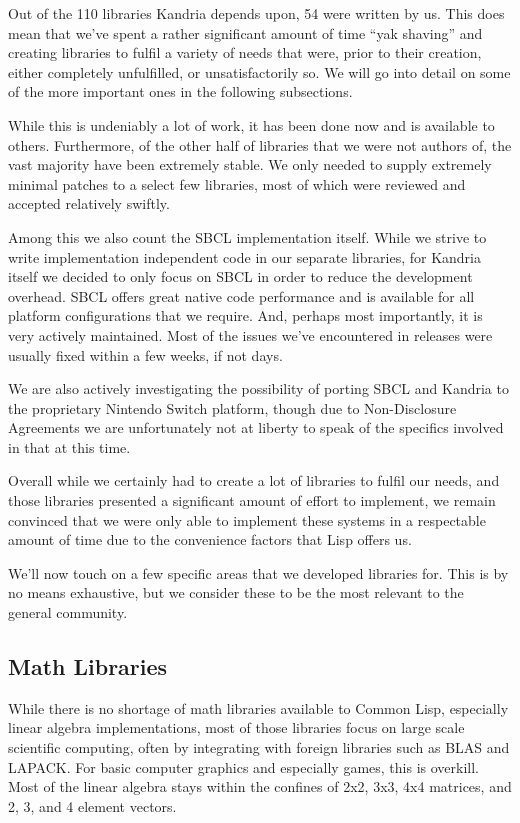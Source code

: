 \documentclass[format=sigconf]{acmart}
\begin{document}
Out of the 110 libraries Kandria depends upon, 54 were written by us. This does mean that we've spent a rather significant amount of time ``yak shaving'' and creating libraries to fulfil a variety of needs that were, prior to their creation, either completely unfulfilled, or unsatisfactorily so. We will go into detail on some of the more important ones in the following subsections.

While this is undeniably a lot of work, it has been done now and is available to others. Furthermore, of the other half of libraries that we were not authors of, the vast majority have been extremely stable. We only needed to supply extremely minimal patches to a select few libraries, most of which were reviewed and accepted relatively swiftly.

Among this we also count the SBCL implementation itself. While we strive to write implementation independent code in our separate libraries, for Kandria itself we decided to only focus on SBCL in order to reduce the development overhead. SBCL offers great native code performance and is available for all platform configurations that we require. And, perhaps most importantly, it is very actively maintained. Most of the issues we've encountered in releases were usually fixed within a few weeks, if not days.

We are also actively investigating the possibility of porting SBCL and Kandria to the proprietary Nintendo Switch platform, though due to Non-Disclosure Agreements we are unfortunately not at liberty to speak of the specifics involved in that at this time.

Overall while we certainly had to create a lot of libraries to fulfil our needs, and those libraries presented a significant amount of effort to implement, we remain convinced that we were only able to implement these systems in a respectable amount of time due to the convenience factors that Lisp offers us.

We'll now touch on a few specific areas that we developed libraries for. This is by no means exhaustive, but we consider these to be the most relevant to the general community.

\subsection{Math Libraries}\label{math}
While there is no shortage of math libraries available to Common Lisp, especially linear algebra implementations, most of those libraries focus on large scale scientific computing, often by integrating with foreign libraries such as BLAS and LAPACK. For basic computer graphics and especially games, this is overkill. Most of the linear algebra stays within the confines of 2x2, 3x3, 4x4 matrices, and 2, 3, and 4 element vectors.
\end{document}
